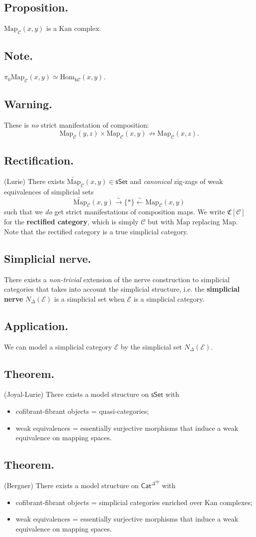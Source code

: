 \documentclass{article}
\numberwithin{equation}{subsection}
\renewcommand{\ss}[1]{\subsection{#1}}
\newcommand{\Hom}{\mathrm{Hom}}
\newcommand{\sset}{\mathsf{sSet}}
\newcommand{\C}{\mathcal{C}}
\newcommand{\h}{\mathrm{h}}
\newcommand{\Map}{\mathrm{Map}}
\begin{document}
        \ss{Proposition.}
            $\Map_\C(x,y)$ is a Kan complex.

        \ss{Note.}
            $\pi_0\Map_\C(x,y)\simeq\Hom_{\h\C}(x,y)$.

        \ss{Warning.}
            These is \emph{no} strict manifestation of composition:
            \[
                \Map_\C(y,z)\times\Map_\C(x,y) \not\to \Map_\C(x,z).
            \]

        \ss{Rectification.} (Lurie)
            There exists $\widetilde{\Map}_\C(x,y)\in\sset$ and \emph{canonical} zig-zags of weak equivalences of simplicial sets
            \[
                \widetilde{\Map}_\C(x,y) \xrightarrow{\sim} \{*\} \xleftarrow{\sim} \Map_\C(x,y)
            \]
            such that we \emph{do} get strict manifestations of composition maps.
            We write $\mathfrak{C}[\C]$ for the \textbf{rectified category}, which is simply $\C$ but with $\widetilde{\Map}$ replacing $\Map$.
            Note that the rectified category is a true simplicial category.

        \ss{Simplicial nerve.}
            There exists a \emph{non-trivial} extension of the nerve construction to simplicial categories that takes into account the simplicial structure, i.e. the \textbf{simplicial nerve} $N_\Delta(\mathcal{E})$ is a simplicial set when $\mathcal{E}$ is a simplicial category.

        \ss{Application.}
            We can model a simplicial category $\mathcal{E}$ by the simplicial set $N_\Delta(\mathcal{E})$.

        \ss{Theorem.} (Joyal-Lurie)
            There exists a model structure on $\sset$ with
            \begin{itemize}
                \item cofibrant-fibrant objects = quasi-categories;
                \item weak equivalences = essentially surjective morphisms that induce a weak equivalence on mapping spaces.
            \end{itemize}

        \ss{Theorem.} (Bergner)
            There exists a model structure on $\mathsf{Cat}^{\Delta^\mathrm{op}}$ with
            \begin{itemize}
                \item cofibrant-fibrant objects = simplicial categories enriched over Kan complexes;
                \item weak equivalences = essentially surjective morphisms that induce a weak equivalence on mapping spaces.
            \end{itemize}
\end{document}
